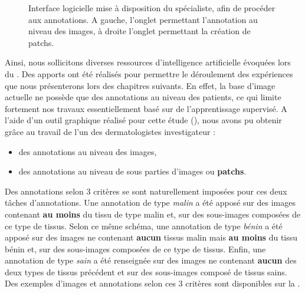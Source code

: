 \begin{figure}[H]
\begin{subfigure}{.45\textwidth}
    \end{subfigure}
    \caption{Interface logicielle mise à disposition du spécialiste, afin de procéder aux annotations. A gauche, l'onglet permettant l'annotation au niveau des images, à droite l'onglet permettant la création de patchs.}
    \label{fig:example_gui_annotation}
\end{figure}

Ainsi, nous sollicitons diverses ressources d'intelligence artificielle évoquées lors du . Des apports ont été réalisés pour permettre le déroulement des expériences que nous présenterons lors des chapitres suivants. En effet, la base d'image actuelle ne possède que des annotations au niveau des patients, ce qui limite fortement nos travaux essentiellement basé sur de l'apprentissage supervisé. A l'aide d'un outil graphique réalisé pour cette étude (), nous avons pu obtenir grâce au travail de l'un des dermatologistes investigateur :
\begin{itemize}
    \item des annotations au niveau des images,
    \item des annotations au niveau de sous parties d'images ou \textbf{patchs}.
\end{itemize}\par

Des annotations selon 3 critères se sont naturellement imposées pour ces deux tâches d'annotations. Une annotation de type \textit{malin} a été apposé sur des images contenant \textbf{au moins} du tissu de type malin et, sur des sous-images composées de ce type de tissus. Selon ce même schéma, une annotation de type \textit{bénin} a été apposé sur des images ne contenant \textbf{aucun} tissus malin mais \textbf{au moins} du tissu bénin et, sur des sous-images composées de ce type de tissus. Enfin, une annotation de type \textit{sain} a été renseignée sur des images ne contenant \textbf{aucun} des deux types de tissus précédent et sur des sous-images composé de tissus sains. Des exemples d'images et annotations selon ces 3 critères sont disponibles sur la .\par

